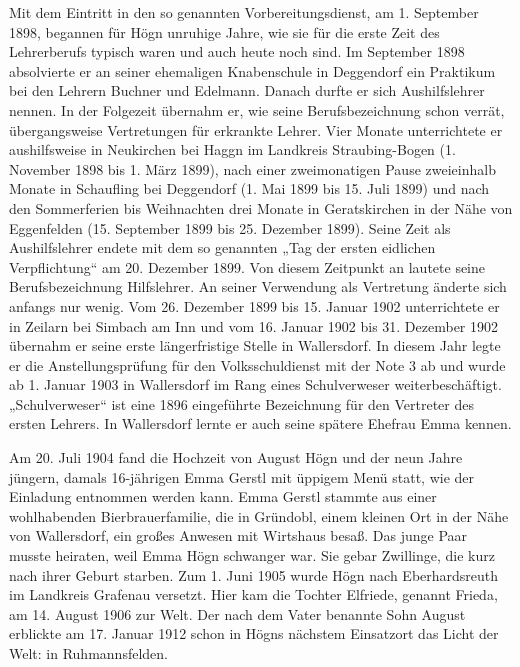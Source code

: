\documentclass{book}
\begin{document}
Mit dem Eintritt in den so genannten Vorbereitungsdienst, am 1.
September 1898, begannen für Högn unruhige Jahre, wie sie für die erste
Zeit des Lehrer\-berufs typisch waren und auch heute noch sind. Im
September 1898 absol\-vierte er an seiner ehemaligen Knabenschule in
Deggendorf ein Praktikum bei den Lehrern Buchner und Edelmann. Danach
durfte er sich Aushilfslehrer nennen. In der Folgezeit übernahm er, wie
seine Berufsbezeichnung schon verrät, übergangsweise Vertretungen für
erkrankte Lehrer. Vier Monate unter\-richtete er aushilfsweise in
Neukirchen bei Haggn im Landkreis Straubing-Bogen (1. November 1898 bis
1. März 1899), nach einer zweimonatigen Pause zweieinhalb Monate in
Schaufling bei Deggendorf (1. Mai 1899 bis 15. Juli 1899) und nach den
Sommerferien bis Weihnachten drei Monate in Gerats\-kirchen in der Nähe
von Eggenfelden (15. September 1899 bis 25. Dezember 1899). Seine Zeit
als Aushilfslehrer endete mit dem so genannten „Tag der ersten
eidlichen Verpflichtung“ am 20. Dezember 1899. Von diesem Zeit\-punkt
an lautete seine Berufsbezeichnung Hilfslehrer. An seiner Verwendung
als Vertretung änderte sich anfangs nur wenig. Vom 26. Dezember 1899
bis 15. Januar 1902 unterrichtete er in Zeilarn bei Simbach am Inn und
vom 16. Januar 1902 bis 31. Dezember 1902 übernahm er seine erste
längerfristige Stelle in Wallersdorf. In diesem Jahr legte er die
Anstellungsprüfung für den Volksschuldienst mit der Note 3 ab und wurde
ab 1. Januar 1903 in Wallers\-dorf im Rang eines Schulverweser
weiterbeschäftigt. „Schulverweser“ ist eine 1896 eingeführte
Bezeichnung für den Vertreter des ersten Lehrers. In Wal\-lersdorf
lernte er auch seine spätere Ehefrau Emma kennen.


Am 20. Juli 1904 fand die Hochzeit von August Högn und der neun Jahre
jüngern, damals 16-jährigen Emma Gerstl mit üppigem Menü statt, wie der
Einladung entnommen werden kann. Emma Gerstl stammte aus einer
wohl\-habenden Bierbrauerfamilie, die in Gründobl, einem kleinen Ort in
der Nähe von Wallersdorf, ein großes Anwesen mit Wirtshaus besaß. Das
junge Paar musste heiraten, weil Emma Högn schwanger war. Sie gebar
Zwillinge, die kurz nach ihrer Geburt starben. Zum 1. Juni 1905 wurde
Högn nach Eber\-hardsreuth im Landkreis Grafenau versetzt. Hier kam die
Tochter Elfriede, genannt Frieda, am 14. August 1906 zur Welt. Der nach
dem Vater benannte Sohn August erblickte am 17. Januar 1912 schon in
Högns nächstem Einsatz\-ort das Licht der Welt: in Ruhmannsfelden.
\end{document}
